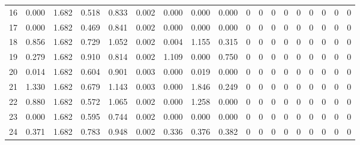 \begin{tabular}{rrrrrrrrrrrrrrrrrr}
16 & 0.000 & 1.682 & 0.518 & 0.833 & 0.002 & 0.000 & 0.000 & 0.000 & 0 & 0 & 0 & 0 & 0 & 0 & 0 & 0 & 0 \\
17 & 0.000 & 1.682 & 0.469 & 0.841 & 0.002 & 0.000 & 0.000 & 0.000 & 0 & 0 & 0 & 0 & 0 & 0 & 0 & 0 & 0 \\
18 & 0.856 & 1.682 & 0.729 & 1.052 & 0.002 & 0.004 & 1.155 & 0.315 & 0 & 0 & 0 & 0 & 0 & 0 & 0 & 0 & 0 \\
19 & 0.279 & 1.682 & 0.910 & 0.814 & 0.002 & 1.109 & 0.000 & 0.750 & 0 & 0 & 0 & 0 & 0 & 0 & 0 & 0 & 0 \\
20 & 0.014 & 1.682 & 0.604 & 0.901 & 0.003 & 0.000 & 0.019 & 0.000 & 0 & 0 & 0 & 0 & 0 & 0 & 0 & 0 & 0 \\
21 & 1.330 & 1.682 & 0.679 & 1.143 & 0.003 & 0.000 & 1.846 & 0.249 & 0 & 0 & 0 & 0 & 0 & 0 & 0 & 0 & 0 \\
22 & 0.880 & 1.682 & 0.572 & 1.065 & 0.002 & 0.000 & 1.258 & 0.000 & 0 & 0 & 0 & 0 & 0 & 0 & 0 & 0 & 0 \\
23 & 0.000 & 1.682 & 0.595 & 0.744 & 0.002 & 0.000 & 0.000 & 0.000 & 0 & 0 & 0 & 0 & 0 & 0 & 0 & 0 & 0 \\
24 & 0.371 & 1.682 & 0.783 & 0.948 & 0.002 & 0.336 & 0.376 & 0.382 & 0 & 0 & 0 & 0 & 0 & 0 & 0 & 0 & 0 \\
\bottomrule
\end{tabular}
